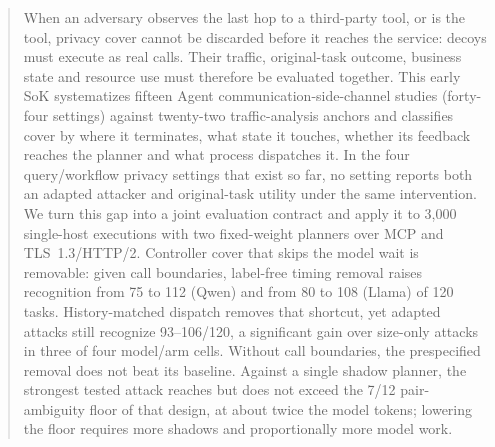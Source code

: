 \begin{abstract}
When an adversary observes the last hop to a third-party tool, or is the tool, privacy cover cannot be discarded before it reaches the service: decoys must execute as real calls. Their traffic, original-task outcome, business state and resource use must therefore be evaluated together. This early SoK systematizes fifteen Agent communication-side-channel studies (forty-four settings) against twenty-two traffic-analysis anchors and classifies cover by where it terminates, what state it touches, whether its feedback reaches the planner and what process dispatches it. In the four query/workflow privacy settings that exist so far, no setting reports both an adapted attacker and original-task utility under the same intervention. We turn this gap into a joint evaluation contract and apply it to 3,000 single-host executions with two fixed-weight planners over MCP and TLS~1.3/HTTP/2. Controller cover that skips the model wait is removable: given call boundaries, label-free timing removal raises recognition from 75 to 112 (Qwen) and from 80 to 108 (Llama) of 120 tasks. History-matched dispatch removes that shortcut, yet adapted attacks still recognize 93--106/120, a significant gain over size-only attacks in three of four model/arm cells. Without call boundaries, the prespecified removal does not beat its baseline. Against a single shadow planner, the strongest tested attack reaches but does not exceed the 7/12 pair-ambiguity floor of that design, at about twice the model tokens; lowering the floor requires more shadows and proportionally more model work.
\end{abstract}

